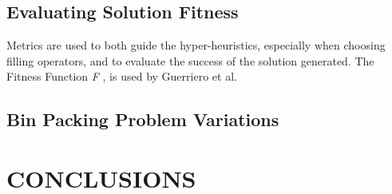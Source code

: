 \documentclass{llncs}
\begin{document}
\subsection{Evaluating Solution Fitness}
Metrics are used to both guide the hyper-heuristics, especially when choosing filling operators, and to evaluate the success of the solution generated. The Fitness Function \emph{F} \cite{lopez2014unified}, is used by Guerriero et al. 
\subsection{Bin Packing Problem Variations}

\section{CONCLUSIONS}



\end{document}
